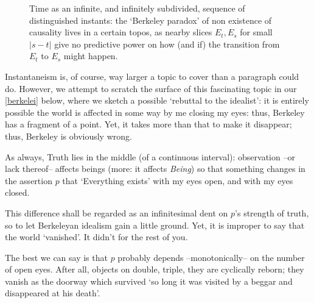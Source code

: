 \begin{example}
\begin{center}
\begin{figure}[h]
      \caption{Time as an infinite, and infinitely subdivided, sequence of distinguished instants: the `Berkeley paradox' of non existence of causality lives in a certain topos, as nearby slices $E_t, E_s$ for small $|s-t|$ give no predictive power on how (and if) the transition from $E_t$ to $E_s$ might happen.}
      \label{fig:berkeley}
    \end{figure}
  \end{center}
\end{example}
Instantaneism is, of course, way larger a topic to cover than a paragraph could do. However, we attempt to scratch the surface of this fascinating topic in our \autoref{berkelei} below, where we sketch a possible `rebuttal to the idealist': it is entirely possible the world is affected in some way by me closing my eyes: thus, Berkeley has a fragment of a point. Yet, it takes more than that to make it disappear; thus, Berkeley is obviously wrong.

As always, Truth lies in the middle (of a continuous interval): observation --or lack thereof-- affects beings (more: it affects \emph{Being}) so that something changes in the assertion $p$ that `Everything exists' with my eyes open, and with my eyes closed.

This difference shall be regarded as an infinitesimal dent on $p$'s strength of truth, so to let Berkeleyan idealism gain a little ground. Yet, it is improper to say that the world `vanished'. It didn't for the rest of you.

The best we can say is that $p$ probably depends --monotonically-- on the number of open eyes. After all, objects on \tlon double, triple, they are cyclically reborn; they vanish as the doorway which survived `so long it was visited by a beggar and disappeared at his death'.